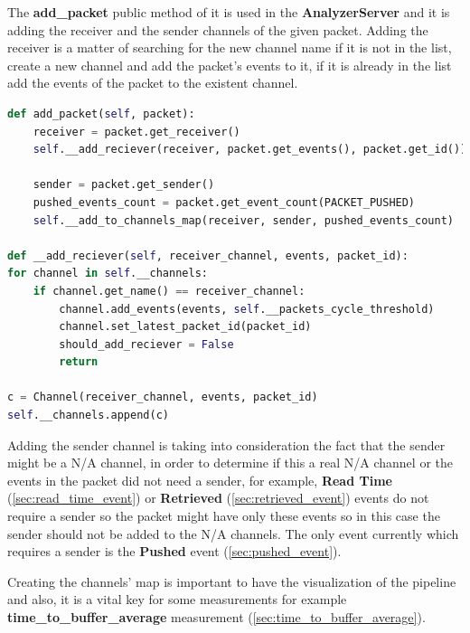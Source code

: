 The \textbf{add\_packet} public method of it is used in the \textbf{AnalyzerServer}
and it is adding the receiver and the sender channels of the given packet. Adding the receiver is 
a matter of searching for the new channel name if it is not in the list, create a new channel
and add the packet's events to it, if it is already in the list add the events of 
the packet to the existent channel.
\newline
\begin{lstlisting}[language=Python, label=code:add_packet, caption={Add receiving channel},captionpos=b]
def add_packet(self, packet):
	receiver = packet.get_receiver()
	self.__add_reciever(receiver, packet.get_events(), packet.get_id())

	sender = packet.get_sender()
	pushed_events_count = packet.get_event_count(PACKET_PUSHED)
	self.__add_to_channels_map(receiver, sender, pushed_events_count)

def __add_reciever(self, receiver_channel, events, packet_id):
for channel in self.__channels:
	if channel.get_name() == receiver_channel:
		channel.add_events(events, self.__packets_cycle_threshold)
		channel.set_latest_packet_id(packet_id)
		should_add_reciever = False
		return

c = Channel(receiver_channel, events, packet_id)
self.__channels.append(c)
\end{lstlisting}

Adding the sender channel is taking into consideration the fact that the sender might be a N/A channel,
in order to determine if this a real N/A channel or the events in the packet did not need a sender, for 
example, \textbf{Read Time} (\ref{sec:read_time_event}) or \textbf{Retrieved} (\ref{sec:retrieved_event}) 
events do not require a sender so the packet
might have only these events so in this case the sender should not be added to the N/A channels.
The only event currently which requires a sender is the \textbf{Pushed} event (\ref{sec:pushed_event}).

Creating the channels' map is important to have the visualization of the pipeline and also, it is a vital
key for some measurements for example \textbf{time\_to\_buffer\_average} measurement (\ref{sec:time_to_buffer_average}).


